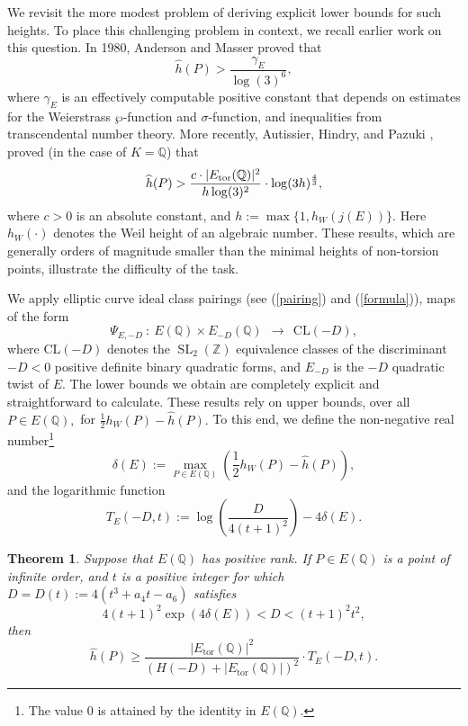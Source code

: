 \documentclass[12pt]{amsart}
\newtheorem{theorem}{Theorem}[section]
\newcommand{\CL}{\mathrm{CL}}
\newcommand{\Z}{\mathbb{Z}}
\newcommand{\Q}{\mathbb{Q}}
\newcommand{\SL}{\operatorname{SL}}
\newcommand{\tor}{\mathrm{tor}}
\numberwithin{equation}{section}
\begin{document}
We revisit  the more modest problem of deriving explicit lower bounds for such heights.
To place this challenging problem in context, we recall earlier work on this question.
In 1980, Anderson and Masser proved \cite{AM} that
\begin{equation}\label{one}
\widehat{h}(P)>\frac{\gamma_E}{\log(3)^6},
\end{equation}
where $\gamma_E$ is an effectively computable positive constant that depends on
estimates for the Weierstrass $\wp$-function and $\sigma$-function, and
inequalities from transcendental number theory.
More recently, Autissier, Hindry, and Pazuki \cite{AHP}, proved (in the case of  $K=\Q$) that
\begin{equation}\label{two}
\widehat{h}(P)> {\color{black} \frac{c\cdot |E_{\tor}(\Q)|^2}{h \log(3)^2}\cdot \log(3h)^{\frac{4}{3}}},
\end{equation}
where $c>0$ is an absolute constant, and $h:=\max\{1, h_W(j(E))\}.$ Here $h_W(\cdot)$ denotes the Weil  height of an algebraic number. These results, which are generally orders of magnitude smaller than the minimal heights of non-torsion points,
illustrate the difficulty of the task.

We apply elliptic curve ideal class pairings (see (\ref{pairing}) and (\ref{formula})), maps of the form
$$
\Psi_{E,-D} \ : \ E(\Q)\times E_{-D}(\Q) \ \ \longrightarrow\ \  \CL(-D),
$$
where $\CL(-D)$ denotes the $\SL_2(\Z)$ equivalence classes of the discriminant $-D<0$ positive definite binary quadratic forms, and $E_{-D}$ is the $-D$ quadratic twist of $E.$ 
The lower bounds we obtain are completely explicit and straightforward to calculate.
These results rely on upper bounds, over all $P\in E(\Q),$ for $\tfrac{1}{2}h_W(P)-\widehat{h}(P).$
To this end, we define the non-negative real number\footnote{The value 0 is attained by the identity in $E(\Q).$}
\begin{equation}
\delta(E):=\max_{P\in E(\Q)} \left(\frac{1}{2}h_W(P)-\widehat{h}(P)\right),
\end{equation}
and the logarithmic function
\begin{equation}\label{Tconstant}
T_E(-D,t):=\log\left(\frac{D}{4(t+1)^2} \right)-4\delta(E).
\end{equation}

\begin{theorem}\label{MainTheorem}
Suppose that $E(\Q)$ has positive rank. If $P\in E(\Q)$ is a point of infinite order, and $t$ is a positive integer for which 
$D=D(t):=4(t^3+a_4t-a_6)$ satisfies
\[ 
4(t+1)^2 \exp(4\delta(E))<D<(t+1)^2t^2,
\]
then
\[\widehat{h}(P) \geq \frac{|E_\tor(\Q)|^2}{(H(-D)+|E_\tor(\Q)|)^2} \cdot T_E(-D,t).
\]
\end{theorem}
\end{document}
